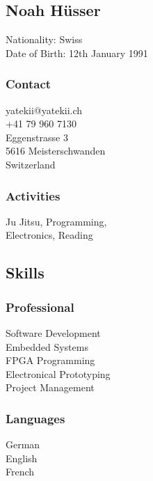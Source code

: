 \documentclass[]{resume}
\begin{document}

\begin{facts}
\section{Noah Hüsser}
\sectionsep
\sectionsep

Nationality: Swiss\\
Date of Birth: 12th January 1991
\sectionsep

\subsubsection{Contact}
yatekii@yatekii.ch\\
+41 79 960 7130\\
\sectionsep
Eggenstrasse 3\\
5616 Meisterschwanden\\
Switzerland
\sectionsep

\subsubsection{Activities}
Ju Jitsu, Programming,\\
Electronics, Reading
\sectionsep


\subsection{Skills}

\subsubsection{Professional}
Software Development\\
Embedded Systems\\
FPGA Programming\\
Electronical Prototyping\\
Project Management
\sectionsep

\subsubsection{Languages}
German \\
English \\
French 
\sectionsep


\end{facts}
\end{document}
